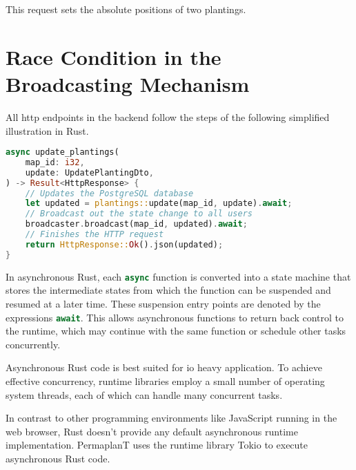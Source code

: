 \documentclass[final,oneside]{vutinfth}
\newcommand{\rustsnippet}[1]{\lstinline[language=rust]{#1}}
\begin{document}
This request sets the absolute positions of two plantings.

\section{Race Condition in the Broadcasting Mechanism}

All \gls{http} endpoints in the backend follow the steps of the following simplified illustration in Rust.

\begin{minipage}{\linewidth}
\begin{lstlisting}[language=rust]
async update_plantings(
    map_id: i32,
    update: UpdatePlantingDto,
) -> Result<HttpResponse> {
    // Updates the PostgreSQL database
    let updated = plantings::update(map_id, update).await;
    // Broadcast out the state change to all users
    broadcaster.broadcast(map_id, updated).await;
    // Finishes the HTTP request
    return HttpResponse::Ok().json(updated);
}
\end{lstlisting}
\end{minipage}

In asynchronous Rust, each \rustsnippet{async} function is converted into a state machine that stores the intermediate states from which the function can be suspended and resumed at a later time. 
These suspension entry points are denoted by the expressions \rustsnippet{await}.
This allows asynchronous functions to return back control to the runtime, which may continue with the same function or schedule other tasks concurrently\cite{rustasyncdeepdive2024}.

Asynchronous Rust code is best suited for \gls{io} heavy application.
To achieve effective concurrency, runtime libraries employ a small number of operating system threads, each of which can handle many concurrent tasks\cite{rustasyncbookchapter}. 

In contrast to other programming environments like JavaScript running in the web browser\cite{mdnjavascripteventloop}, Rust doesn't provide any default asynchronous runtime implementation.
PermaplanT uses the runtime library Tokio \cite{tokiocrate} to execute asynchronous Rust code.
\end{document}
